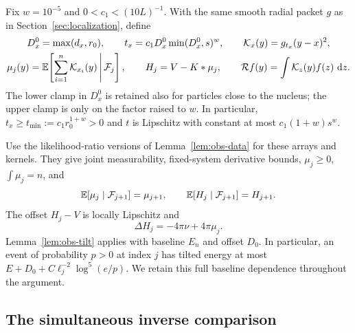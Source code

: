 Fix $w=10^{-5}$ and $0<c_1<(10L)^{-1}$. With the same smooth radial
packet $g$ as in Section~\ref{sec:localization}, define
\begin{equation}\label{a:eq:cond-master}
 \begin{gathered}
 D_x^0=\max(d_x,r_0),\qquad
 t_x=c_1D_x^0\min(D_x^0,s)^w,\qquad
 \mathcal K_x(y)=g_{t_x}(y-x)^2,\\
 \mu_j(y)=\mathbb E\!\left[\sum_{i=1}^n\mathcal K_{x_i}(y)
                    \,\middle|\,\mathcal F_j\right],\qquad
 H_j=V-K*\mu_j,\qquad
 \mathcal R f(y)=\int\mathcal K_z(y)f(z)\,\,\mathrm d z.
 \end{gathered}
\end{equation}
The lower clamp in $D_x^0$ is retained also for particles close to
the nucleus; the upper clamp is only on the factor raised to $w$.
In particular, $t_x\ge t_{\min}:=c_1r_0^{1+w}>0$ and $t$ is
Lipschitz with constant at most $c_1(1+w)s^w$.


Use the likelihood-ratio versions of Lemma~\ref{lem:obs-data} for these
arrays and kernels. They give joint measurability, fixed-system derivative
bounds, $\mu_j\ge0$, $\int\mu_j=n$, and
\begin{equation}\label{a:eq:cond-tower}
 \mathbb E[\mu_j\mid\mathcal F_{j+1}]=\mu_{j+1},\qquad
 \mathbb E[H_j\mid\mathcal F_{j+1}]=H_{j+1}.
\end{equation}
The offset $H_j-V$ is locally Lipschitz and
\begin{equation}\label{a:eq:cond-poisson}
 \Delta H_j=-4\pi\nu+4\pi\mu_j.
\end{equation}
Lemma~\ref{lem:obs-tilt} applies with baseline $E_n$ and offset $D_0$.
In particular, an event of probability $p>0$ at index $j$ has tilted
energy at most $E+D_0+C\ell_j^{-2}\log^5(e/p)$. We retain this full
baseline dependence throughout the argument.

\subsection{The simultaneous inverse comparison}

